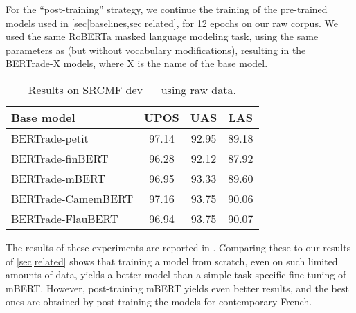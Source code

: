 For the \enquote{post-training} strategy, we continue the training of the pre-trained models used in \cref{sec|baselines,sec|related}, for \num{12} epochs on our raw corpus. We used the same RoBERTa masked language modeling task, using the same parameters as \citet{wang-etal-2020-extending} (but without vocabulary modifications), resulting in the BERTrade-X models, where X is the name of the base model.

\begin{table}[tbh]
    \centering
    \tablefontsize
    \begin{tabular}{l*{3}{S[table-format=2.2]}}
        \toprule
        {\textbf{Base model}} & {\textbf{UPOS}} & {\textbf{UAS}} & {\textbf{LAS}} \\
        \midrule
        BERTrade-petit        & 97.14           & 92.95          & 89.18          \\
        \midrule
        BERTrade-finBERT      & 96.28           & 92.12          & 87.92          \\
        BERTrade-mBERT        & 96.95           & 93.33          & 89.60          \\
        BERTrade-CamemBERT    & 97.16           & 93.75          & 90.06          \\
        BERTrade-FlauBERT     & 96.94           & 93.75          & 90.07          \\
        \bottomrule
    \end{tabular}
    \caption{Results on SRCMF dev — using raw data.}\label{tab|post-train}
\end{table}

The results of these experiments are reported in . Comparing these to our results of \cref{sec|related} shows that training a model from scratch, even on such limited amounts of data, yields a better model than a simple task-specific fine-tuning of mBERT. However, post-training mBERT yields even better results, and the best ones are obtained by post-training the models for contemporary French.

